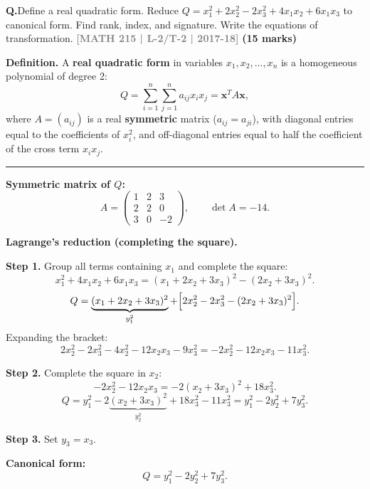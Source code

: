\documentclass[12pt,a3paper]{article}
\newcommand{\yr}[1]{\hfill\textcolor{gray}{\small\textbf{[#1]}}}
\newcommand{\mk}[1]{\textcolor{orange!70!black}{\small\textbf{(#1 marks)}}}
\newcounter{qnum}
\newcommand{\Q}[1]{%
  \needspace{4\baselineskip}
  \refstepcounter{qnum}
  \vspace{6pt}
  \noindent\textbf{Q\theqnum.}\enspace #1\par
}
\begin{document}
\Q{Define a real quadratic form. Reduce $Q = x_1^2 + 2x_2^2 - 2x_3^2 + 4x_1x_2 + 6x_1x_3$ to canonical form. Find rank, index, and signature. Write the equations of transformation.
\yr{MATH 215 | L-2/T-2 | 2017-18} \mk{15}}

\begin{tcolorbox}[enhanced,breakable,
  colback=cE!4,colframe=cE,boxrule=0.8pt,arc=5pt,
  title={\textbf{Answer --- Real Quadratic Form \& Canonical Reduction of
    $Q = x_1^2+2x_2^2-2x_3^2+4x_1x_2+6x_1x_3$}},
  fonttitle=\bfseries\color{white},colbacktitle=cE]

\textbf{Definition.}
A \textbf{real quadratic form} in variables $x_1,x_2,\ldots,x_n$ is a
homogeneous polynomial of degree 2:
\[
  Q = \sum_{i=1}^n\sum_{j=1}^n a_{ij}x_i x_j = \mathbf{x}^T A \mathbf{x},
\]
where $A=(a_{ij})$ is a real \textbf{symmetric} matrix ($a_{ij}=a_{ji}$),
with diagonal entries equal to the coefficients of $x_i^2$, and
off-diagonal entries equal to half the coefficient of the cross term $x_ix_j$.

\medskip\textcolor{cE}{\rule{\textwidth}{0.4pt}}

\textbf{Symmetric matrix of $Q$:}
\[
  A = \begin{pmatrix}1&2&3\\2&2&0\\3&0&-2\end{pmatrix}, \qquad \det A = -14.
\]

\textbf{Lagrange's reduction (completing the square).}

\textbf{Step 1.} Group all terms containing $x_1$ and complete the square:
\[
  x_1^2 + 4x_1 x_2 + 6x_1 x_3
  = (x_1 + 2x_2 + 3x_3)^2 - (2x_2+3x_3)^2.
\]
\[
  Q = \underbrace{(x_1+2x_2+3x_3)^2}_{y_1^2}
    + \Bigl[2x_2^2 - 2x_3^2 - (2x_2+3x_3)^2\Bigr].
\]
Expanding the bracket:
\[
  2x_2^2-2x_3^2 - 4x_2^2-12x_2 x_3-9x_3^2 = -2x_2^2-12x_2 x_3-11x_3^2.
\]

\textbf{Step 2.} Complete the square in $x_2$:
\[
  -2x_2^2 - 12x_2 x_3
  = -2(x_2+3x_3)^2 + 18x_3^2.
\]
\[
  Q = y_1^2 - 2\underbrace{(x_2+3x_3)^2}_{y_2^2}
    + 18x_3^2 - 11x_3^2
  = y_1^2 - 2y_2^2 + 7y_3^2.
\]

\textbf{Step 3.} Set $y_3 = x_3$.

\medskip
\textbf{Canonical form:}
\[
  \boxed{Q = y_1^2 - 2y_2^2 + 7y_3^2.}
\]


\end{tcolorbox}
\end{document}
